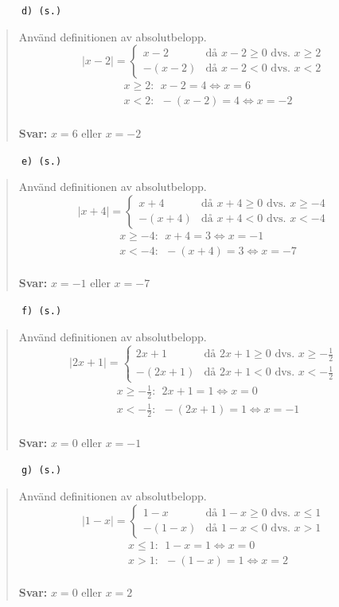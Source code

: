 \documentclass[a4paper]{article}
\newcommand{\tskcol}[1]{\textcolor{tskcol}{#1}}
\begin{document}
	\pagebreak
	\texttt{\tskcol{~~~~~~d) (s.)}}
	\begin{quotation}
		\noindent
		Använd definitionen av absolutbelopp.
		\[|x-2|=
		\begin{cases}
		x-2&    \text{då } x-2 \ge 0 \text{ dvs. } x \ge 2\\
		-(x-2)& \text{då } x-2 < 0   \text{ dvs. } x < 2
		\end{cases}\]
		\begin{align*}
		& x \ge 2:~~ x-2=4 \Leftrightarrow x=6 \\
		& x < 2:~~ -(x-2)=4 \Leftrightarrow x=-2
		\end{align*}
		\\
		\textbf{Svar:} $x=6$ eller $x=-2$
	\end{quotation}
	
	\texttt{\tskcol{~~~~~~e) (s.)}}
	\begin{quotation}
		\noindent
		Använd definitionen av absolutbelopp.
		\[|x+4|=
		\begin{cases}
		x+4&    \text{då } x+4 \ge 0 \text{ dvs. } x \ge -4\\
		-(x+4)& \text{då } x+4 < 0   \text{ dvs. } x < -4
		\end{cases}\]
		\begin{align*}
		& x \ge -4:~~ x+4=3 \Leftrightarrow x=-1 \\
		& x < -4:~~ -(x+4)=3 \Leftrightarrow x=-7
		\end{align*}
		\\
		\textbf{Svar:} $x=-1$ eller $x=-7$
	\end{quotation}
	
	\texttt{\tskcol{~~~~~~f) (s.)}}
	\begin{quotation}
		\noindent
		Använd definitionen av absolutbelopp.
		\[|2x+1|=
		\begin{cases}
		2x+1&    \text{då } 2x+1 \ge 0 \text{ dvs. } x \ge -\tfrac{1}{2}\\
		-(2x+1)& \text{då } 2x+1 < 0   \text{ dvs. } x < -\tfrac{1}{2}
		\end{cases}\]
		\begin{align*}
		& x \ge -\tfrac{1}{2}:~~ 2x+1=1 \Leftrightarrow x=0 \\
		& x < -\tfrac{1}{2}:~~ -(2x+1)=1 \Leftrightarrow x=-1
		\end{align*}
		\\
		\textbf{Svar:} $x=0$ eller $x=-1$
	\end{quotation}
	
	\texttt{\tskcol{~~~~~~g) (s.)}}
	\begin{quotation}
		\noindent
		Använd definitionen av absolutbelopp.
		\[|1-x|=
		\begin{cases}
		1-x&    \text{då } 1-x \ge 0 \text{ dvs. } x \le 1\\
		-(1-x)& \text{då } 1-x < 0   \text{ dvs. } x > 1
		\end{cases}\]
		\begin{align*}
		& x \le 1:~~ 1-x=1 \Leftrightarrow x=0 \\
		& x > 1:~~ -(1-x)=1 \Leftrightarrow x=2
		\end{align*}
		\\
		\textbf{Svar:} $x=0$ eller $x=2$
	\end{quotation}
	
\end{document}
